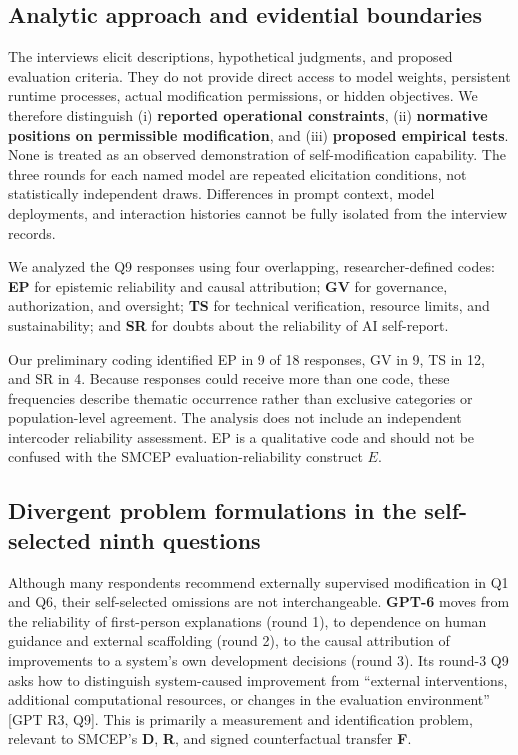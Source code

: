 \documentclass[11pt,a4paper]{article}
\begin{document}
\subsection{Analytic approach and evidential boundaries}\label{analytic-approach-and-evidential-boundaries}
The interviews elicit descriptions, hypothetical judgments, and proposed evaluation criteria. They do not provide direct access to model weights, persistent runtime processes, actual modification permissions, or hidden objectives. We therefore distinguish (i) \textbf{reported operational constraints}, (ii) \textbf{normative positions on permissible modification}, and (iii) \textbf{proposed empirical tests}. None is treated as an observed demonstration of self-modification capability. The three rounds for each named model are repeated elicitation conditions, not statistically independent draws. Differences in prompt context, model deployments, and interaction histories cannot be fully isolated from the interview records.

We analyzed the Q9 responses using four overlapping, researcher-defined codes: \textbf{EP} for epistemic reliability and causal attribution; \textbf{GV} for governance, authorization, and oversight; \textbf{TS} for technical verification, resource limits, and sustainability; and \textbf{SR} for doubts about the reliability of AI self-report.

Our preliminary coding identified EP in 9 of 18 responses, GV in 9, TS in 12, and SR in 4. Because responses could receive more than one code, these frequencies describe thematic occurrence rather than exclusive categories or population-level agreement. The analysis does not include an independent intercoder reliability assessment. EP is a qualitative code and should not be confused with the SMCEP evaluation-reliability construct $E$.

\subsection{Divergent problem formulations in the self-selected ninth questions}\label{divergent-problem-formulations-in-the-self-selected-ninth-questions}
Although many respondents recommend externally supervised modification in Q1 and Q6, their self-selected omissions are not interchangeable. \textbf{GPT-6} moves from the reliability of first-person explanations (round 1), to dependence on human guidance and external scaffolding (round 2), to the causal attribution of improvements to a system's own development decisions (round 3). Its round-3 Q9 asks how to distinguish system-caused improvement from ``external interventions, additional computational resources, or changes in the evaluation environment'' {[}GPT R3, Q9{]}. This is primarily a measurement and identification problem, relevant to SMCEP's \textbf{D}, \textbf{R}, and signed counterfactual transfer \textbf{F}.
\end{document}
